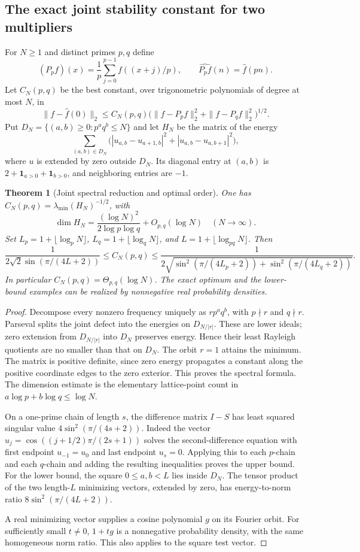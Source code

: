 \documentclass[11pt,a4paper]{article}
\newtheorem{theorem}{Theorem}[section]
\theoremstyle{definition}
\theoremstyle{remark}
\theoremstyle{plain}
\numberwithin{equation}{section}
\begin{document}
\subsection{The exact joint stability constant for two multipliers}
For $N\ge1$ and distinct primes $p,q$ define
\[
(P_pf)(x)=\frac1p\sum_{j=0}^{p-1}f((x+j)/p),
\qquad \widehat{P_pf}(n)=\widehat f(pn).
\]
Let $C_N(p,q)$ be the best constant, over trigonometric polynomials
of degree at most $N$, in
\begin{equation}\label{sc:eq:joint-stability}
\|f-\widehat f(0)\|_2\le C_N(p,q)
\bigl(\|f-P_pf\|_2^2+\|f-P_qf\|_2^2\bigr)^{1/2}.
\end{equation}
Put $D_N=\{(a,b)\ge0:p^aq^b\le N\}$ and let $H_N$ be the matrix
of the energy
\[
\sum_{(a,b)\in D_N}
\bigl(|u_{a,b}-u_{a+1,b}|^2+|u_{a,b}-u_{a,b+1}|^2\bigr),
\]
where $u$ is extended by zero outside $D_N$.
Its diagonal entry at $(a,b)$ is $2+\boldsymbol1_{a>0}
+\boldsymbol1_{b>0}$, and neighboring entries are $-1$.

\begin{theorem}[Joint spectral reduction and optimal order]
\label{sc:thm:joint-stability}
One has $C_N(p,q)=\lambda_{\min}(H_N)^{-1/2}$, with
\[
\dim H_N=\frac{(\log N)^2}{2\log p\log q}+O_{p,q}(\log N)
\quad(N\longrightarrow\infty).
\]
Set $L_p=1+\lfloor\log_pN\rfloor$,
$L_q=1+\lfloor\log_qN\rfloor$,
and $L=1+\lfloor\log_{pq}N\rfloor$. Then
\[
\frac1{2\sqrt2\sin(\pi/(4L+2))}
\le C_N(p,q)\le
\frac1{2\sqrt{\sin^2(\pi/(4L_p+2))+
\sin^2(\pi/(4L_q+2))}}.
\]
In particular $C_N(p,q)=\Theta_{p,q}(\log N)$. The exact optimum
and the lower-bound examples can be realized by nonnegative real
probability densities.
\end{theorem}
\begin{proof}
Decompose every nonzero frequency uniquely as $rp^aq^b$, with
$p\nmid r$ and $q\nmid r$. Parseval splits the joint defect into
the energies on $D_{N/|r|}$. These are lower ideals; zero extension
from $D_{N/|r|}$ into $D_N$ preserves energy. Hence their least
Rayleigh quotients are no smaller than that on $D_N$. The orbit
$r=1$ attains the minimum. The matrix is positive definite, since
zero energy propagates a constant along the positive coordinate
edges to the zero exterior. This proves the spectral formula.
The dimension estimate is the elementary lattice-point count in
$a\log p+b\log q\le\log N$.

On a one-prime chain of length $s$, the difference matrix $I-S$
has least squared singular value $4\sin^2(\pi/(4s+2))$.
Indeed the vector $u_j=\cos((j+1/2)\pi/(2s+1))$ solves the
second-difference equation with first endpoint $u_{-1}=u_0$ and
last endpoint $u_s=0$. Applying this to each $p$-chain and each
$q$-chain and adding the resulting inequalities proves the upper
bound. For the lower bound, the square $0\le a,b<L$ lies inside
$D_N$. The tensor product of the two length-$L$ minimizing vectors,
extended by zero, has energy-to-norm ratio
$8\sin^2(\pi/(4L+2))$.

A real minimizing vector supplies a cosine polynomial $g$ on its
Fourier orbit. For sufficiently small $t\ne0$, $1+tg$ is a
nonnegative probability density, with the same homogeneous norm
ratio. This also applies to the square test vector.
\end{proof}
\end{document}
